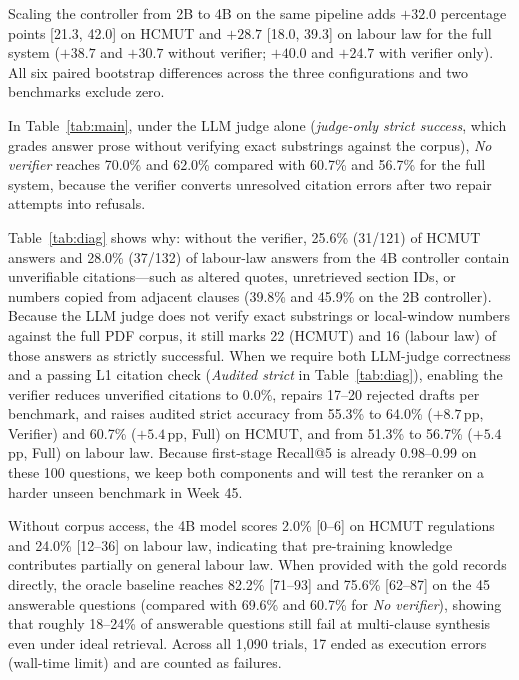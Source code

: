 Scaling the controller from 2B to 4B on the same pipeline adds $+32.0$ percentage points [21.3, 42.0] on HCMUT and $+28.7$ [18.0, 39.3] on labour law for the full system ($+38.7$ and $+30.7$ without verifier; $+40.0$ and $+24.7$ with verifier only). All six paired bootstrap differences across the three configurations and two benchmarks exclude zero.

 In Table~\ref{tab:main}, under the LLM judge alone (\emph{judge-only strict success}, which grades answer prose without verifying exact substrings against the corpus), \emph{No verifier} reaches 70.0\% and 62.0\% compared with 60.7\% and 56.7\% for the full system, because the verifier converts unresolved citation errors after two repair attempts into refusals.

Table~\ref{tab:diag} shows why: without the verifier, 25.6\% (31/121) of HCMUT answers and 28.0\% (37/132) of labour-law answers from the 4B controller contain unverifiable citations---such as altered quotes, unretrieved section IDs, or numbers copied from adjacent clauses (39.8\% and 45.9\% on the 2B controller). Because the LLM judge does not verify exact substrings or local-window numbers against the full PDF corpus, it still marks 22 (HCMUT) and 16 (labour law) of those answers as strictly successful. When we require both LLM-judge correctness and a passing L1 citation check (\emph{Audited strict} in Table~\ref{tab:diag}), enabling the verifier reduces unverified citations to 0.0\%, repairs 17--20 rejected drafts per benchmark, and raises audited strict accuracy from 55.3\% to 64.0\% ($+8.7$\,pp, Verifier) and 60.7\% ($+5.4$\,pp, Full) on HCMUT, and from 51.3\% to 56.7\% ($+5.4$\,pp, Full) on labour law. Because first-stage Recall@5 is already 0.98--0.99 on these 100 questions, we keep both components and will test the reranker on a harder unseen benchmark in Week 45.




 Without corpus access, the 4B model scores 2.0\% [0--6] on HCMUT regulations and 24.0\% [12--36] on labour law, indicating that pre-training knowledge contributes partially on general labour law. When provided with the gold records directly, the oracle baseline reaches 82.2\% [71--93] and 75.6\% [62--87] on the 45 answerable questions (compared with 69.6\% and 60.7\% for \emph{No verifier}), showing that roughly 18--24\% of answerable questions still fail at multi-clause synthesis even under ideal retrieval. Across all 1,090 trials, 17 ended as execution errors (wall-time limit) and are counted as failures.

